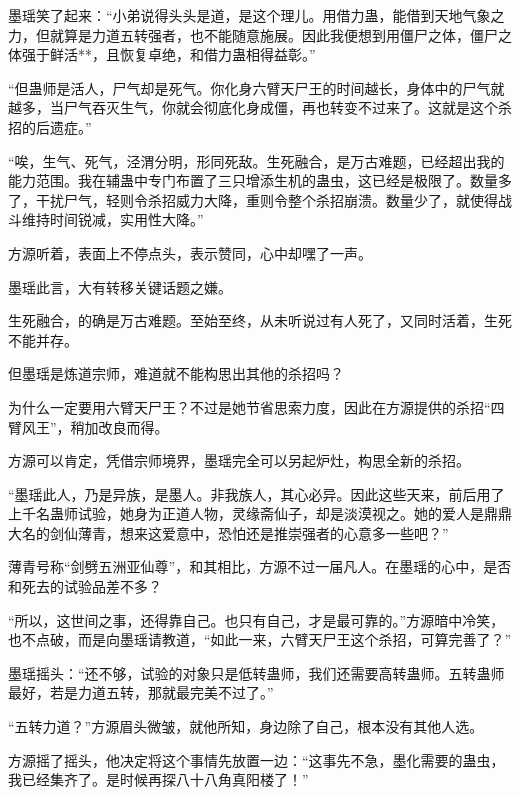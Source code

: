\begin{this_body}
墨瑶笑了起来：“小弟说得头头是道，是这个理儿。用借力蛊，能借到天地气象之力，但就算是力道五转强者，也不能随意施展。因此我便想到用僵尸之体，僵尸之体强于鲜活**，且恢复卓绝，和借力蛊相得益彰。”

“但蛊师是活人，尸气却是死气。你化身六臂天尸王的时间越长，身体中的尸气就越多，当尸气吞灭生气，你就会彻底化身成僵，再也转变不过来了。这就是这个杀招的后遗症。”

“唉，生气、死气，泾渭分明，形同死敌。生死融合，是万古难题，已经超出我的能力范围。我在辅蛊中专门布置了三只增添生机的蛊虫，这已经是极限了。数量多了，干扰尸气，轻则令杀招威力大降，重则令整个杀招崩溃。数量少了，就使得战斗维持时间锐减，实用性大降。”

方源听着，表面上不停点头，表示赞同，心中却嘿了一声。

墨瑶此言，大有转移关键话题之嫌。

生死融合，的确是万古难题。至始至终，从未听说过有人死了，又同时活着，生死不能并存。

但墨瑶是炼道宗师，难道就不能构思出其他的杀招吗？

为什么一定要用六臂天尸王？不过是她节省思索力度，因此在方源提供的杀招“四臂风王”，稍加改良而得。

方源可以肯定，凭借宗师境界，墨瑶完全可以另起炉灶，构思全新的杀招。

“墨瑶此人，乃是异族，是墨人。非我族人，其心必异。因此这些天来，前后用了上千名蛊师试验，她身为正道人物，灵缘斋仙子，却是淡漠视之。她的爱人是鼎鼎大名的剑仙薄青，想来这爱意中，恐怕还是推崇强者的心意多一些吧？”

薄青号称“剑劈五洲亚仙尊”，和其相比，方源不过一届凡人。在墨瑶的心中，是否和死去的试验品差不多？

“所以，这世间之事，还得靠自己。也只有自己，才是最可靠的。”方源暗中冷笑，也不点破，而是向墨瑶请教道，“如此一来，六臂天尸王这个杀招，可算完善了？”

墨瑶摇头：“还不够，试验的对象只是低转蛊师，我们还需要高转蛊师。五转蛊师最好，若是力道五转，那就最完美不过了。”

“五转力道？”方源眉头微皱，就他所知，身边除了自己，根本没有其他人选。

方源摇了摇头，他决定将这个事情先放置一边：“这事先不急，墨化需要的蛊虫，我已经集齐了。是时候再探八十八角真阳楼了！”

\end{this_body}


